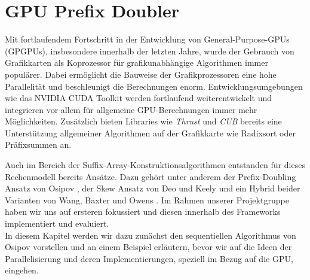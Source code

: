 \section{GPU Prefix Doubler}
\label{algorithm:gpuprefix}

Mit fortlaufendem Fortschritt in der Entwicklung von General-Purpose-GPUs (GPGPUs), insbesondere innerhalb der letzten Jahre, wurde der Gebrauch von Grafikkarten als Koprozessor für grafikunabhängige Algorithmen immer populärer. Dabei ermöglicht die Bauweise der Grafikprozessoren eine hohe Parallelität und beschleunigt die Berechnungen enorm. Entwicklungsumgebungen wie das NVIDIA CUDA Toolkit werden fortlaufend weiterentwickelt und integrieren vor allem für allgemeine GPU-Berechnungen immer mehr Möglichkeiten. Zusätzlich bieten Libraries wie \textit{Thrust} und \textit{CUB} bereits eine Unterstützung allgemeiner Algorithmen auf der Grafikkarte wie Radixsort oder Präfixsummen an.

Auch im Bereich der Suffix-Array-Konstruktionsalgorithmen entstanden für dieses Rechenmodell bereits Ansätze. Dazu gehört unter anderem der Prefix-Doubling Ansatz von Osipov \cite{osipovGPU}, der Skew Ansatz von Deo und Keely \cite{deoGPU} und ein Hybrid beider Varianten von Wang, Baxter und Owens \cite{wangGPU}. Im Rahmen unserer Projektgruppe haben wir uns auf ersteren fokussiert und diesen innerhalb des Frameworks implementiert und evaluiert.\\
In diesem Kapitel werden wir dazu zunächst den sequentiellen Algorithmus von Osipov vorstellen und an einem Beispiel erläutern, bevor wir auf die Ideen der Parallelisierung und deren Implementierungen, speziell im Bezug auf die GPU, eingehen.
